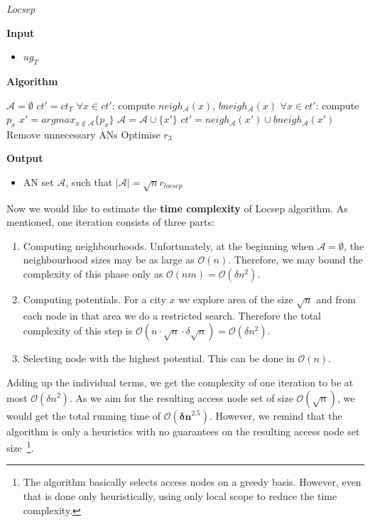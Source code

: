 		\color{algcolor}
		\begin{algorithm}[H]
			\color{inalgcolor}
			\caption{\textit{Locsep}}
			\label{alg:locsep}
			\textbf{Input} 
			\begin{itemize}
				\item $ug_{T}$
			\end{itemize}
			\textbf{Algorithm}
			\begin{algorithmic}
				\STATE $\mathcal{A} = \emptyset$
				\STATE $ct' = ct_{T}$
					\STATE $\forall x \in ct'$: compute $neigh_{\mathcal{A}}(x)$, $bneigh_{\mathcal{A}}(x)$
					\STATE $\forall x \in ct'$: compute $p_{x}$
					\STATE $x' = argmax_{x \not \in \mathcal{A}} \{p_{x}\}$
					\STATE $\mathcal{A} = \mathcal{A} \cup \{x'\}$
					\STATE $ct' = neigh_{\mathcal{A}}(x') \cup bneigh_{\mathcal{A}}(x')$
				\ENDWHILE
				\STATE Remove unnecessary ANs
				\STATE Optimise $r_{3}$
			\end{algorithmic}
			\textbf{Output}
			\begin{itemize}
				\item AN set $\mathcal{A}$, such that $|\mathcal{A}| = \sqrt{n} r_{locsep}$
			\end{itemize}
		\end{algorithm}
		\color{black}
		
		\noindent Now we would like to estimate the \textbf{time complexity} of Locsep algorithm. As mentioned, one iteration consists of three parts:
		\begin{enumerate}
			\item Computing neighbourhoods. Unfortunately, at the beginning when $\mathcal{A} = \emptyset$, the neighbourhood sizes may be as large as $\mathcal{O}(n)$. Therefore, we may bound the complexity of this phase only as $\mathcal{O}(nm) = \mathcal{O}(\delta n^{2})$.
			\item Computing potentials. For a city $x$ we explore area of the size $\sqrt{n}$ and from each node in that area we do a restricted search. Therefore the total complexity of this step is $\mathcal{O}(n \cdot \sqrt{n} \cdot \delta \sqrt{n}) = \mathcal{O}(\delta n^{2})$.
			\item Selecting node with the highest potential. This can be done in $\mathcal{O}(n)$.
		\end{enumerate}
		\hspace*{\fill}
		
		\noindent Adding up the individual terms, we get the complexity of one iteration to be at most $\mathcal{O}(\delta n^{2})$. As we aim for the resulting access node set of size $\mathcal{O}(\sqrt{n})$, we would get the total running time of $\bm{\mathcal{O}(\delta n^{2.5})}$. However, we remind that the algorithm is only a heuristics with no guarantees on the resulting access node set size~\footnote{The algorithm basically selects access nodes on a greedy basis. However, even that is done only heuristically, using only local scope to reduce the time complexity.}.
		
